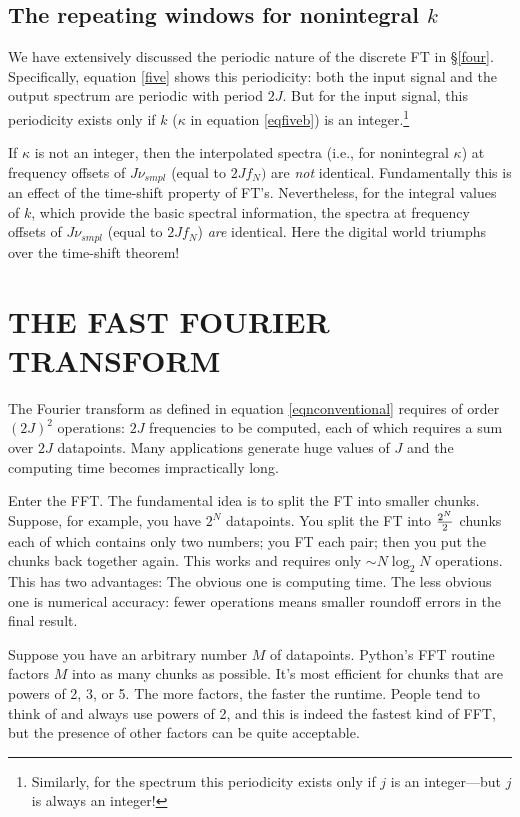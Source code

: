 \documentclass[11pt,preprint]{aastex}
\begin{document}
\subsection{ The repeating windows for nonintegral $k$}
\label{sectionseven}

	We have extensively discussed the periodic nature of the
discrete FT in \S \ref{four}. Specifically, equation \ref{five} shows
this periodicity: both the input signal and the output spectrum are
periodic with period $2J$. But for the input signal, this periodicity
exists only if $k$ ($\kappa$ in equation \ref{eqfiveb}) is an
integer.\footnote{Similarly, for the spectrum this periodicity exists
only if $j$ is an integer---but $j$ is always an integer!}

	If $\kappa$ is not an integer, then the interpolated spectra
(i.e., for nonintegral $\kappa$) at frequency offsets of $J \nu_{smpl}$
(equal to $2J f_N)$ are {\it not} identical. Fundamentally this is an
effect of the time-shift property of FT's. Nevertheless, for the
integral values of $k$, which provide the basic spectral information,
the spectra at frequency offsets of $J \nu_{smpl}$ (equal to $2J f_N$)
{\it are} identical. Here the digital world triumphs over the time-shift
theorem!

\section{THE FAST FOURIER TRANSFORM}

	The Fourier transform as defined in equation
\ref{eqnconventional} requires of order $(2J)^2$ operations: $2J$
frequencies to be computed, each of which requires a sum over $2J$
datapoints. Many applications generate huge values of $J$ and the
computing time becomes impractically long.

	Enter the FFT. The fundamental idea is to split the FT into
smaller chunks. Suppose, for example, you have $2^N$ datapoints. You
split the FT into $2^N \over 2$ chunks each of which contains only two
numbers; you FT each pair; then you put the chunks back together again.
This works and requires only $\sim N \log_2 N$ operations. This has two
advantages:  The obvious one is computing time. The less obvious one is
numerical accuracy: fewer operations means smaller roundoff errors in
the final result.

 Suppose you have an arbitrary number $M$ of datapoints. Python's
FFT routine factors $M$ into as many chunks as possible. It's most
efficient for chunks that are powers of 2, 3, or 5. The more factors,
the faster the runtime. People tend to think of and always use powers of
2, and this is indeed the fastest kind of FFT, but the presence of other
factors can be quite acceptable.
\end{document}
